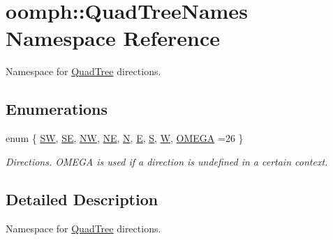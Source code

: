 \hypertarget{namespaceoomph_1_1QuadTreeNames}{}\section{oomph\+:\+:Quad\+Tree\+Names Namespace Reference}
\label{namespaceoomph_1_1QuadTreeNames}


Namespace for \hyperlink{classoomph_1_1QuadTree}{Quad\+Tree} directions.  


\subsection*{Enumerations}
\begin{DoxyCompactItemize}
\item 
enum \{ \newline
\hyperlink{namespaceoomph_1_1QuadTreeNames_a8954a5947b19986b8c4b755bc7639f7dab02ffb52d34a25323447061474613d81}{SW}, 
\hyperlink{namespaceoomph_1_1QuadTreeNames_a8954a5947b19986b8c4b755bc7639f7da03479dd620c853ccd3c767125d6f29a4}{SE}, 
\hyperlink{namespaceoomph_1_1QuadTreeNames_a8954a5947b19986b8c4b755bc7639f7daa01c8378aad2e474250e6ebefb9fa942}{NW}, 
\hyperlink{namespaceoomph_1_1QuadTreeNames_a8954a5947b19986b8c4b755bc7639f7daa66bca2eb077ff943b39305b1965826f}{NE}, 
\newline
\hyperlink{namespaceoomph_1_1QuadTreeNames_a8954a5947b19986b8c4b755bc7639f7dabc60bec4cc294aa2adf92726c6d6823a}{N}, 
\hyperlink{namespaceoomph_1_1QuadTreeNames_a8954a5947b19986b8c4b755bc7639f7da585070bd0e3801c3bbed287ef3c4a265}{E}, 
\hyperlink{namespaceoomph_1_1QuadTreeNames_a8954a5947b19986b8c4b755bc7639f7da85b07d6c087e0cb66bac32a0b6a45198}{S}, 
\hyperlink{namespaceoomph_1_1QuadTreeNames_a8954a5947b19986b8c4b755bc7639f7daabab2a070c062503375f8264f1b6d7d6}{W}, 
\newline
\hyperlink{namespaceoomph_1_1QuadTreeNames_a8954a5947b19986b8c4b755bc7639f7da9eb65052764b429e1b5d7b313d751629}{O\+M\+E\+GA} =26
 \}\begin{DoxyCompactList}\small\item\em Directions. O\+M\+E\+GA is used if a direction is undefined in a certain context. \end{DoxyCompactList}
\end{DoxyCompactItemize}


\subsection{Detailed Description}
Namespace for \hyperlink{classoomph_1_1QuadTree}{Quad\+Tree} directions. 

